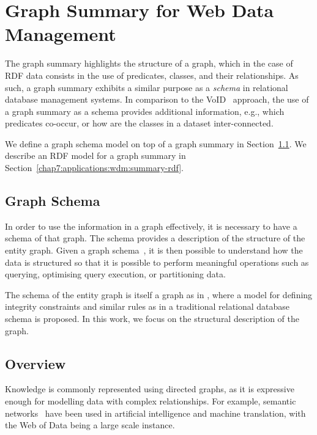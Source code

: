 \section{Graph Summary for Web Data Management}
\label{chap7:applications:wdm}

The graph summary highlights the structure of a graph, which in the case of RDF data consists in the use of predicates, classes, and their relationships. As such, a graph summary exhibits a similar purpose as a \emph{schema} in relational database management systems. In comparison to the VoID~\cite{alexander:2009:dld} approach, the use of a graph summary as a schema provides additional information, e.g., which predicates co-occur, or how are the classes in a dataset inter-connected.

We define a graph schema model on top of a graph summary in Section~\ref{chap7:applications:wdm:graph-schema}. We describe an RDF model for a graph summary in Section~\ref{chap7:applications:wdm:summary-rdf}.

\subsection{Graph Schema}
\label{chap7:applications:wdm:graph-schema}

In order to use the information in a graph effectively, it is necessary to have a schema of that graph. The schema provides a description of the structure of the entity graph. Given a graph schema~\cite{buneman:1997:asu,kunii1983graph}, it is then possible to understand how the data is structured so that it is possible to perform meaningful operations such as querying, optimising query execution, or partitioning data.%

The schema of the entity graph is itself a graph as in \cite{kunii1983graph}, where a model for defining integrity constraints and similar rules as in a traditional relational database schema is proposed. In this work, we focus on the structural description of the graph.%

\subsection{Overview}

Knowledge is commonly represented using directed graphs, as it is expressive enough for modelling data with complex relationships. For example, semantic networks~\cite{quillan:1966:semantic} have been used in artificial intelligence and machine translation, with the Web of Data being a large scale instance.

